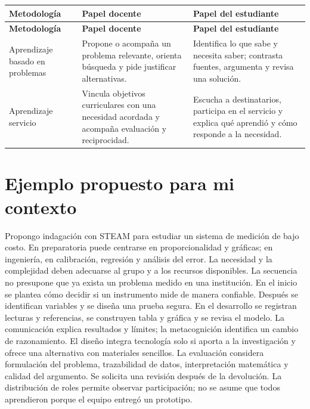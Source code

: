 \documentclass[spanish,letterpaper,oneside]{article}
\begin{document}
{\small{}\renewcommand{\arraystretch}{1.25}
\begin{longtable}{|>{\raggedright\arraybackslash}p{}|>{\raggedright\arraybackslash}p{}|>{\raggedright\arraybackslash}p{}|}\hline
\rowcolor{iiiepePale} \textbf{Metodología} & \textbf{Papel docente} & \textbf{Papel del estudiante} \\\hline
\endfirsthead
\hline
\rowcolor{iiiepePale} \textbf{Metodología} & \textbf{Papel docente} & \textbf{Papel del estudiante} \\\hline
\endhead
Aprendizaje basado en problemas & Propone o acompaña un problema relevante, orienta búsqueda y pide justificar alternativas. & Identifica lo que sabe y necesita saber; contrasta fuentes, argumenta y revisa una solución. \\\hline
Aprendizaje servicio & Vincula objetivos curriculares con una necesidad acordada y acompaña evaluación y reciprocidad. & Escucha a destinatarios, participa en el servicio y explica qué aprendió y cómo responde a la necesidad. \\\hline
\end{longtable}}


\section{Ejemplo propuesto para mi contexto}
Propongo indagación con STEAM para estudiar un sistema de medición de bajo costo. En preparatoria puede centrarse en proporcionalidad y gráficas; en ingeniería, en calibración, regresión y análisis del error. La necesidad y la complejidad deben adecuarse al grupo y a los recursos disponibles. La secuencia no presupone que ya exista un problema medido en una institución.
En el inicio se plantea cómo decidir si un instrumento mide de manera confiable. Después se identifican variables y se diseña una prueba segura. En el desarrollo se registran lecturas y referencias, se construyen tabla y gráfica y se revisa el modelo. La comunicación explica resultados y límites; la metacognición identifica un cambio de razonamiento. El diseño integra tecnología solo si aporta a la investigación y ofrece una alternativa con materiales sencillos.
La evaluación considera formulación del problema, trazabilidad de datos, interpretación matemática y calidad del argumento. Se solicita una revisión después de la devolución. La distribución de roles permite observar participación; no se asume que todos aprendieron porque el equipo entregó un prototipo.
\end{document}
